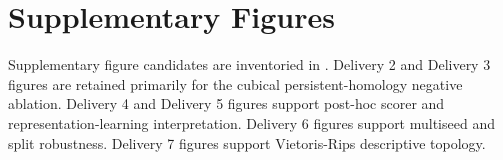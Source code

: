 \section{Supplementary Figures}

Supplementary figure candidates are inventoried in . Delivery 2 and Delivery 3 figures are retained primarily for the cubical persistent-homology negative ablation. Delivery 4 and Delivery 5 figures support post-hoc scorer and representation-learning interpretation. Delivery 6 figures support multiseed and split robustness. Delivery 7 figures support Vietoris-Rips descriptive topology.
